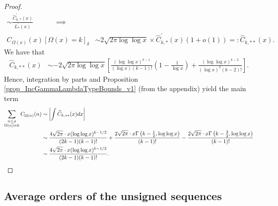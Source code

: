\documentclass[11pt,reqno,a4letter]{article}
\numberwithin{figure}{section}
\numberwithin{table}{section}
\newcommand{\Iverson}[1]{\ensuremath{\left[#1\right]_{\delta}}}
\theoremstyle{plain}
\numberwithin{theorem}{section}
\theoremstyle{definition}
\begin{document}
\begin{proof}
\begin{align*}
     \sim \frac{\widehat{C}_{k,\ast}^{\prime}(x)}{L_{\ast}^{\prime}(x)} \qquad\quad \implies \\ 
     C_{\Omega(x)}(x) \Iverson{\Omega(x) = k} & \sim 
     2\sqrt{2\pi \log\log x} \times \widehat{C}_{k,\ast}^{\prime}(x) (1+o(1)) 
     =: \widehat{C}_{k,\ast\ast}(x). 
\end{align*} 
We have that 
\begin{align*}
     \widehat{C}_{k,\ast\ast}(x) & \sim 
     -2\sqrt{2\pi \log\log x}\left[ 
     \frac{(\log\log x)^{k-1}}{(\log x) (k-1)!} \left( 
     1 - \frac{1}{\log x}\right) + 
     \frac{(\log\log x)^{k-2}}{(\log x)^2 (k-2)!}\right]. 
\end{align*} 
Hence, integration by parts and Proposition \ref{prop_IncGammaLambdaTypeBounds_v1} 
(from the appendix) yield the main term 
\begin{align}
\label{eqn_proofTag_CkAstAstHatx_DerivativeFormula_NeedsIBP_v1} 
\sum_{\substack{n \leq x \\ \Omega(n)=k}} C_{\Omega(n)}(n) & \sim
     \left\lvert \int \widehat{C}_{k,\ast\ast}(x)dx \right\rvert \\ 
\notag
     & \sim 
     \frac{4\sqrt{2\pi} \cdot x (\log\log x)^{k-1/2}}{(2k-1) (k-1)!} + 
     \frac{2\sqrt{2\pi} \cdot x \Gamma\left(k - \frac{1}{2}, \log\log x\right)}{(k-1)!} - 
     \frac{2\sqrt{2\pi} \cdot x \Gamma\left(k - \frac{3}{2}, \log\log x\right)}{(k-1)!} \\ 
     & \sim \frac{4\sqrt{2\pi} \cdot x (\log\log x)^{k-1/2}}{(2k-1) (k-1)!}. 
     \qedhere 
\end{align}
\end{proof}

\subsection{Average orders of the unsigned sequences}
\label{subSection_AvgOrdersOfTheUnsignedSequences} 
\end{document}
